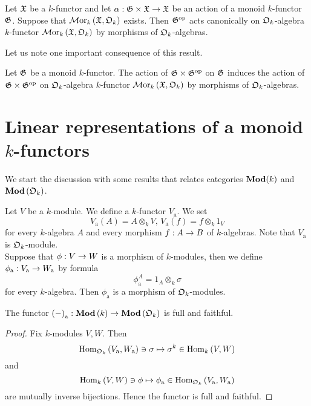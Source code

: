 \begin{proposition}\label{proposition:action_on_regular_k_functor}
Let ${\mathfrak X}$ be a $k$-functor and let $\alpha:{\mathfrak G}\times {\mathfrak X} \rightarrow {\mathfrak X}$ be an action of a monoid $k$-functor ${\mathfrak G}$. Suppose that $\mathcal{M}\mathrm{or}_k\left({\mathfrak X},{\mathfrak O}_k\right)$ exists. Then ${\mathfrak G}^{\mathrm{op}}$ acts canonically on ${\mathfrak O}_k$-algebra $k$-functor $\mathcal{M}\mathrm{or}_k\left({\mathfrak X},{\mathfrak O}_k\right)$ by morphisms of ${\mathfrak O}_k$-algebras.
\end{proposition}
\noindent
Let us note one important consequence of this result.

\begin{corollary}\label{corollary:action_on_regular_k_functor}
Let ${\mathfrak G}$ be a monoid $k$-functor. The action of ${\mathfrak G}\times {\mathfrak G}^{\mathrm{op}}$ on ${\mathfrak G}$ induces the action of ${\mathfrak G}\times {\mathfrak G}^{\mathrm{op}}$ on ${\mathfrak O}_k$-algebra $k$-functor $\mathcal{M}\mathrm{or}_k\left({\mathfrak X},{\mathfrak O}_k\right)$ by morphisms of ${\mathfrak O}_k$-algebras.
\end{corollary}

\section{Linear representations of a monoid $k$-functors}
\noindent
We start the discussion with some results that relates categories $\mathbf{Mod}(k)$ and $\mathbf{Mod}\left({\mathfrak O}_k\right)$.

\begin{example}\label{example:additive_k_functor}
Let $V$ be a $k$-module. We define a $k$-functor $V_{\mathrm{a}}$. We set
$$V_{\mathrm{a}}(A) = A\otimes_kV,\,V_{\mathrm{a}}(f) = f\otimes_k1_V$$
for every $k$-algebra $A$ and every morphism $f:A\rightarrow B$ of $k$-algebras. Note that $V_{\mathrm{a}}$ is ${\mathfrak O}_k$-module.\\
Suppose that $\phi:V\rightarrow W$ is a morphism of $k$-modules, then we define $\phi_{\mathrm{a}}:V_{\mathrm{a}}\rightarrow W_{\mathrm{a}}$ by formula
$$\phi_{\mathrm{a}}^A = 1_A\otimes_k\sigma$$
for every $k$-algebra. Then $\phi_{\mathrm{a}}$ is a morphism of ${\mathfrak O}_k$-modules.
\end{example}

\begin{proposition}\label{proposition:inclusion_of_k_modules_into_O_k_modules}
The functor $\left(-\right)_{\mathrm{a}}:\mathbf{Mod}\left(k\right)\rightarrow \mathbf{Mod}\left({\mathfrak O}_k\right)$ is full and faithful.
\end{proposition}
\begin{proof}
Fix $k$-modules $V,W$. Then
$$\mathrm{Hom}_{{\mathfrak O}_k}\left(V_{\mathrm{a}},W_{\mathrm{a}}\right)\ni \sigma \mapsto \sigma^k\in \mathrm{Hom}_k\left(V,W\right)$$
and
$$\mathrm{Hom}_k\left(V,W\right) \ni \phi \mapsto \phi_{\mathrm{a}} \in \mathrm{Hom}_{{\mathfrak O}_k}\left(V_{\mathrm{a}},W_{\mathrm{a}}\right)$$
are mutually inverse bijections. Hence the functor is full and faithful.
\end{proof}

